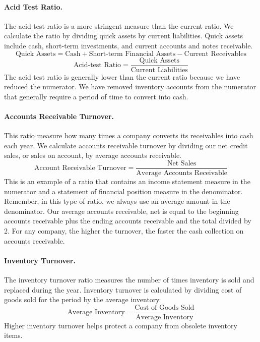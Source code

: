 \documentclass[../main.tex]{subfiles}
\begin{document}
	\paragraph{Acid Test Ratio.} The acid-test ratio is a more stringent 
	measure 
	than the current ratio.  We calculate the ratio by dividing quick assets by 
	current liabilities. Quick assets include cash, short-term investments, and 
	current accounts and notes receivable.
	\[
	\text{Quick Assets}= \text{Cash} + \text{Short-term Financial Assets} - 
	\text{Current Receivables}
	\]
	\[
	\text{Acid-test Ratio} = \frac{\text{Quick Assets}}{\text{Current 
	Liabilities}}
	\]
	The acid test ratio is generally lower than the current ratio because we 
	have reduced the numerator. We have removed inventory accounts from the 
	numerator that generally require a period of time to convert into cash.
	
	\paragraph{Accounts Receivable Turnover.} This ratio measure how many times 
	a company converts its receivables into cash each year. We calculate 
	accounts receivable turnover by dividing our net credit sales, or sales on 
	account, by average accounts receivable. 
	\[
	\text{Account Receivable Turnover} = \frac{\text{Net Sales}}{\text{Average 
	Accounts Receivable}}
	\]
	This is an example of a ratio that contains an income statement measure in 
	the numerator and a statement of financial position measure in the 
	denominator. Remember, in this type of ratio, we always use an average 
	amount in the denominator. Our average accounts receivable, net is equal to 
	the beginning accounts receivable plus the ending accounts receivable and 
	the total divided by 2. For any company, the higher the turnover, the 
	faster the cash collection on accounts receivable.
	
	\paragraph{Inventory Turnover.} The inventory turnover ratio measures the 
	number of times inventory is sold and replaced during the year. Inventory 
	turnover is calculated by dividing cost of goods sold for the period by the 
	average inventory. 
	\[
	\text{Average Inventory} = \frac{\text{Cost of Goods Sold}}{\text{Average 
	Inventory}}
	\]
	Higher inventory turnover helps protect a company from obsolete inventory 
	items.
	
\end{document}
